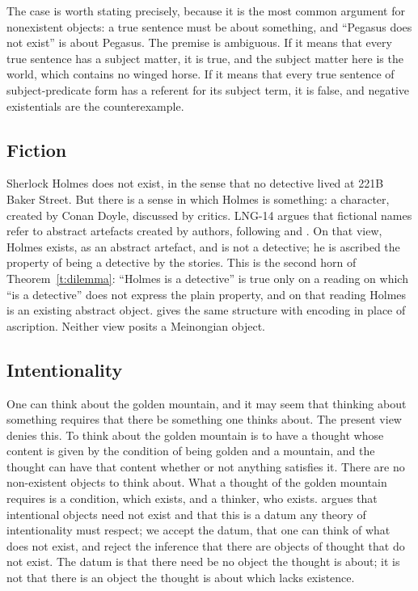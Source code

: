 \documentclass{situationist-preprint}
\begin{document}
The case is worth stating precisely, because it is the most common argument for nonexistent objects: a true sentence must be about something, and \enquote{Pegasus does not exist} is about Pegasus. The premise is ambiguous. If it means that every true sentence has a subject matter, it is true, and the subject matter here is the world, which contains no winged horse. If it means that every true sentence of subject-predicate form has a referent for its subject term, it is false, and negative existentials are the counterexample.

\subsection{Fiction}

Sherlock Holmes does not exist, in the sense that no detective lived at 221B Baker Street. But there is a sense in which Holmes is something: a character, created by Conan Doyle, discussed by critics. LNG-14 argues that fictional names refer to abstract artefacts created by authors, following \citet{Thomasson1999} and \citet{vanInwagen2003}. On that view, Holmes exists, as an abstract artefact, and is not a detective; he is ascribed the property of being a detective by the stories. This is the second horn of Theorem~\ref{t:dilemma}: \enquote{Holmes is a detective} is true only on a reading on which \enquote{is a detective} does not express the plain property, and on that reading Holmes is an existing abstract object. \citet{Zalta1983} gives the same structure with encoding in place of ascription. Neither view posits a Meinongian object.

\subsection{Intentionality}

One can think about the golden mountain, and it may seem that thinking about something requires that there be something one thinks about. The present view denies this. To think about the golden mountain is to have a thought whose content is given by the condition of being golden and a mountain, and the thought can have that content whether or not anything satisfies it. There are no non-existent objects to think about. What a thought of the golden mountain requires is a condition, which exists, and a thinker, who exists. \citet{Crane2013} argues that intentional objects need not exist and that this is a datum any theory of intentionality must respect; we accept the datum, that one can think of what does not exist, and reject the inference that there are objects of thought that do not exist. The datum is that there need be no object the thought is about; it is not that there is an object the thought is about which lacks existence.
\end{document}
